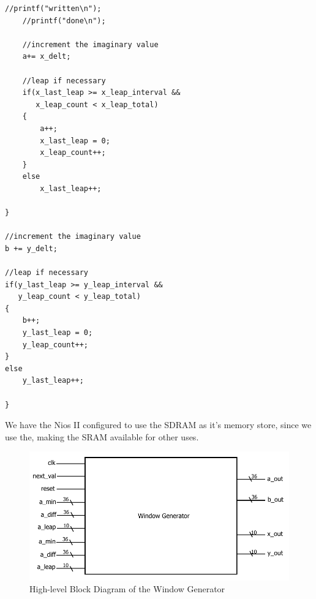 \documentclass{article}
\begin{document}
\begin{lstlisting}[caption="Window Generation Procedure"]
    //printf("written\n");
    //printf("done\n");           
   
    //increment the imaginary value
    a+= x_delt;           
   
    //leap if necessary
    if(x_last_leap >= x_leap_interval &&
       x_leap_count < x_leap_total)
    {
        a++;
        x_last_leap = 0;
        x_leap_count++;
    }
    else
        x_last_leap++;          
   
}

//increment the imaginary value
b += y_delt;

//leap if necessary
if(y_last_leap >= y_leap_interval &&
   y_leap_count < y_leap_total)
{
    b++;
    y_last_leap = 0;
    y_leap_count++;
}
else
    y_last_leap++;

}
\end{lstlisting}

We have the Nios II configured to use the SDRAM as it's memory store,
since we use the, making the SRAM available for other uses.


\begin{figure}[h!]
  \centering
    \includegraphics[width=\textwidth]{block_diagrams/win_gen.pdf}
  \caption{High-level Block Diagram of the Window Generator}
\end{figure}
\end{document}
